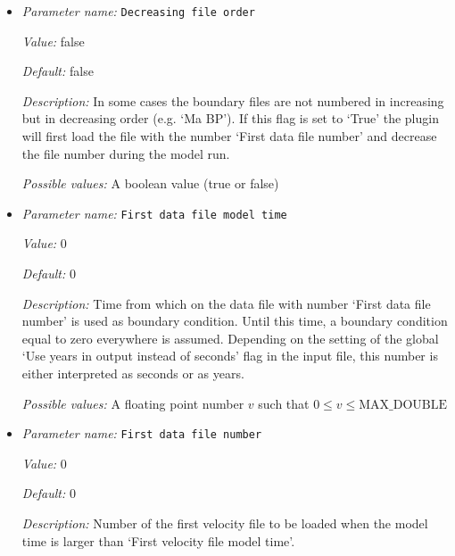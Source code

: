 \begin{itemize}
{\it Possible values:} A floating point number $v$ such that $0 \leq v \leq \text{MAX\_DOUBLE}$
\item {\it Parameter name:} {\tt Decreasing file order}
\label{parameters:Boundary traction model/Ascii data model/Decreasing file order}


{\it Value:} false


{\it Default:} false


{\it Description:} In some cases the boundary files are not numbered in increasing but in decreasing order (e.g. `Ma BP'). If this flag is set to `True' the plugin will first load the file with the number `First data file number' and decrease the file number during the model run.


{\it Possible values:} A boolean value (true or false)
\item {\it Parameter name:} {\tt First data file model time}
\label{parameters:Boundary traction model/Ascii data model/First data file model time}


{\it Value:} 0


{\it Default:} 0


{\it Description:} Time from which on the data file with number `First data file number' is used as boundary condition. Until this time, a boundary condition equal to zero everywhere is assumed. Depending on the setting of the global `Use years in output instead of seconds' flag in the input file, this number is either interpreted as seconds or as years.


{\it Possible values:} A floating point number $v$ such that $0 \leq v \leq \text{MAX\_DOUBLE}$
\item {\it Parameter name:} {\tt First data file number}
\label{parameters:Boundary traction model/Ascii data model/First data file number}


{\it Value:} 0


{\it Default:} 0


{\it Description:} Number of the first velocity file to be loaded when the model time is larger than `First velocity file model time'.



\end{itemize}
